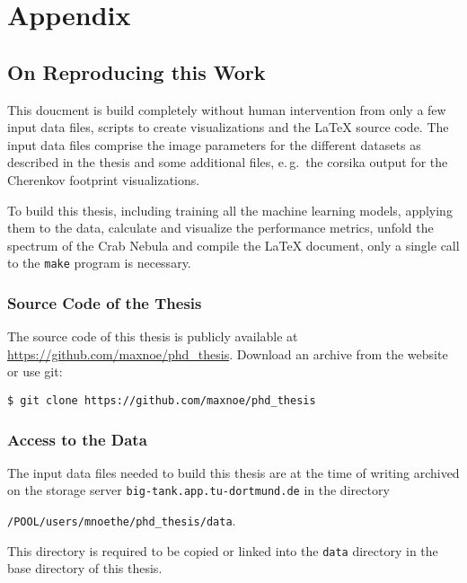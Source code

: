 \appendix
{}

\chapter{Appendix}
\raggedbottom
\captionsetup{hypcap=false}

\section{On Reproducing this Work}\label{apx:reproducing}

This doucment is build completely without human intervention from only a few input 
data files, scripts to create visualizations and the \LaTeX{} source code.
The input data files comprise the image parameters for the different datasets
as described in the thesis and some additional files, e.\,g.\ the \gls{corsika}
output for the Cherenkov footprint visualizations.

To build this thesis, including training all the machine learning models,
applying them to the data, calculate and visualize the performance metrics,
unfold the spectrum of the Crab Nebula and compile the \LaTeX{} document, 
only a single call to the \texttt{make} program is necessary.

\subsection{Source Code of the Thesis}

The source code of this thesis is publicly available at \url{https://github.com/maxnoe/phd_thesis}.
Download an archive from the website or use git:
\begin{lstlisting}
$ git clone https://github.com/maxnoe/phd_thesis 
\end{lstlisting}

\subsection{Access to the Data}

The input data files needed to build this thesis are at the time 
of writing archived on the storage server \texttt{big-tank.app.tu-dortmund.de}
in the directory
\begin{center}
\texttt{/POOL/users/mnoethe/phd\_thesis/data}.
\end{center}
This directory is required to be copied or linked into the \texttt{data} directory
in the base directory of this thesis.


